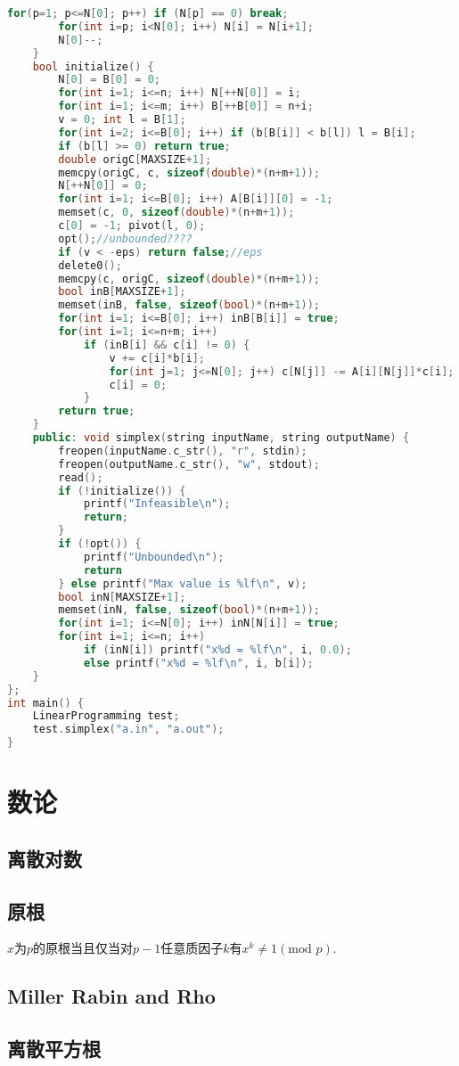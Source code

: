 \documentclass[landscape,a4paper]{article}
\begin{document}
\begin{spacing}{0.3}
\begin{multicols}{3}
\begin{lstlisting}[language=C++]
		for(p=1; p<=N[0]; p++) if (N[p] == 0) break;
		for(int i=p; i<N[0]; i++) N[i] = N[i+1];
		N[0]--;
	}
	bool initialize() {
		N[0] = B[0] = 0;
		for(int i=1; i<=n; i++) N[++N[0]] = i;
		for(int i=1; i<=m; i++) B[++B[0]] = n+i;
		v = 0; int l = B[1];
		for(int i=2; i<=B[0]; i++) if (b[B[i]] < b[l]) l = B[i];
		if (b[l] >= 0) return true;
		double origC[MAXSIZE+1];
		memcpy(origC, c, sizeof(double)*(n+m+1));
		N[++N[0]] = 0;
		for(int i=1; i<=B[0]; i++) A[B[i]][0] = -1;
		memset(c, 0, sizeof(double)*(n+m+1));
		c[0] = -1; pivot(l, 0);
		opt();//unbounded????
		if (v < -eps) return false;//eps
		delete0();
		memcpy(c, origC, sizeof(double)*(n+m+1));
		bool inB[MAXSIZE+1];
		memset(inB, false, sizeof(bool)*(n+m+1));
		for(int i=1; i<=B[0]; i++) inB[B[i]] = true;
		for(int i=1; i<=n+m; i++)
			if (inB[i] && c[i] != 0) {
				v += c[i]*b[i];
				for(int j=1; j<=N[0]; j++) c[N[j]] -= A[i][N[j]]*c[i];
				c[i] = 0;
			}
		return true;
	}
	public: void simplex(string inputName, string outputName) {
		freopen(inputName.c_str(), "r", stdin);
		freopen(outputName.c_str(), "w", stdout);
		read();
		if (!initialize()) {
			printf("Infeasible\n");
			return;
		}
		if (!opt()) {
			printf("Unbounded\n");
			return
		} else printf("Max value is %lf\n", v);
		bool inN[MAXSIZE+1];
		memset(inN, false, sizeof(bool)*(n+m+1));
		for(int i=1; i<=N[0]; i++) inN[N[i]] = true;
		for(int i=1; i<=n; i++)
			if (inN[i]) printf("x%d = %lf\n", i, 0.0);
			else printf("x%d = %lf\n", i, b[i]);
	}
};
int main() {
	LinearProgramming test;
	test.simplex("a.in", "a.out");
}
\end{lstlisting}	
	
	\section{数论}
	\subsection{离散对数}
	
	\subsection{原根}
	$x$为$p$的原根当且仅当对$p-1$任意质因子$k$有$x^{k}\neq 1(\text{mod } p)$.
	\subsection{Miller Rabin and Rho}
	
	\subsection{离散平方根}
	

\end{multicols}
\end{spacing}
\end{document}
